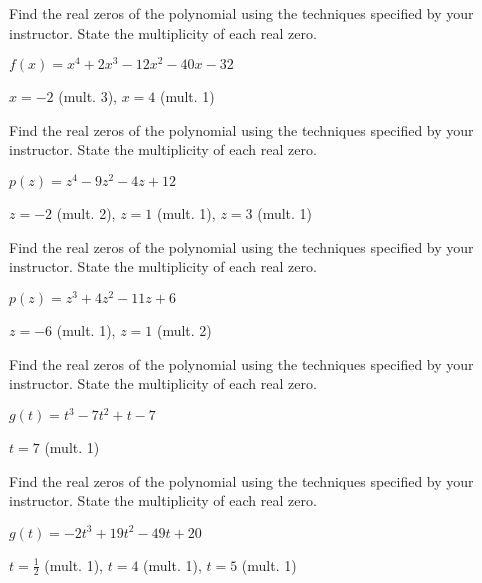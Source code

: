 \documentclass{ximera}
\begin{document}
\begin{problem}
Find the real zeros of the polynomial using the techniques specified by your instructor.  State the multiplicity of each real zero.

$f(x) = x^{4} + 2x^{3} - 12x^{2} - 40x - 32$

\begin{solution}
$x = -2$ (mult. 3), $x = 4$ (mult. 1)   
\end{solution}
\end{problem}

\begin{problem}
Find the real zeros of the polynomial using the techniques specified by your instructor.  State the multiplicity of each real zero.

$p(z) = z^{4} - 9z^{2} - 4z + 12$

\begin{solution}
$z = -2$ (mult. 2), $z = 1$ (mult. 1), $z = 3$ (mult. 1)     
\end{solution}

\end{problem}

\begin{problem}
Find the real zeros of the polynomial using the techniques specified by your instructor.  State the multiplicity of each real zero.

$p(z) = z^{3} + 4z^{2} - 11z + 6$

\begin{solution}
$z = -6$ (mult. 1), $z = 1$ (mult. 2)  
\end{solution}

\end{problem}

\begin{problem}
Find the real zeros of the polynomial using the techniques specified by your instructor.  State the multiplicity of each real zero.

$g(t) = t^{3} - 7t^{2} + t - 7$

\begin{solution}
$t = 7$ (mult. 1) 
\end{solution}
\end{problem}

\begin{problem}
Find the real zeros of the polynomial using the techniques specified by your instructor.  State the multiplicity of each real zero.

$g(t) = -2t^{3} + 19t^{2} - 49t + 20$

\begin{solution}
$t = \frac{1}{2}$ (mult. 1), $t = 4$ (mult. 1), $t = 5$ (mult. 1) 
\end{solution}

\end{problem}
\end{document}
